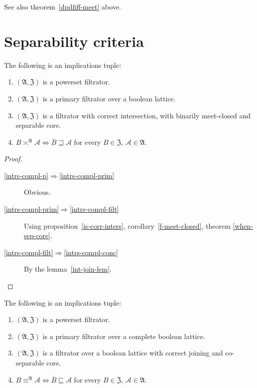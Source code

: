 See also theorem~\ref{dpdfiff-meet} above.

\section{Separability criteria}
\begin{thm}
\label{f-intrs-and-compl}The following is an implications tuple:
\begin{enumerate}
\item \label{intrs-compl-p}$(\mathfrak{A},\mathfrak{Z})$ is a powerset
filtrator.
\item \label{intrs-compl-prim}$(\mathfrak{A},\mathfrak{Z})$ is a primary
filtrator over a boolean lattice.
\item \label{intrs-compl-filt}$(\mathfrak{A},\mathfrak{Z})$ is a filtrator with correct intersection,
with binarily meet-closed and separable core.
\item \label{intrs-compl-conc}$B\asymp^{\mathfrak{A}}\mathcal{A}\Leftrightarrow\overline{B}\sqsupseteq\mathcal{A}$
for every $B\in\mathfrak{Z}$, $\mathcal{A}\in\mathfrak{A}$.
\end{enumerate}
\end{thm}
\begin{proof}
~
\begin{description}
\item [{\ref{intrs-compl-p}$\Rightarrow$\ref{intrs-compl-prim}}] Obvious.
\item [{\ref{intrs-compl-prim}$\Rightarrow$\ref{intrs-compl-filt}}] Using
proposition~\ref{is-corr-inters}, corollary~\ref{f-meet-closed}, theorem
\ref{when-sep-core}.
\item [{\ref{intrs-compl-filt}$\Rightarrow$\ref{intrs-compl-conc}}] By
the lemma~\ref{int-join-lem}.
\end{description}
\end{proof}
\begin{thm}
The following is an implications tuple:
\begin{enumerate}
\item \label{join-compl-p}$(\mathfrak{A},\mathfrak{Z})$ is a powerset
filtrator.
\item \label{join-compl-prim}$(\mathfrak{A},\mathfrak{Z})$ is a primary
filtrator over a complete boolean lattice.
\item \label{join-compl-filt}$(\mathfrak{A},\mathfrak{Z})$ is a filtrator over a boolean lattice
with correct joining and co-separable core.
\item \label{join-compl-conc}$B\equiv^{\mathfrak{A}}\mathcal{A}\Leftrightarrow\overline{B}\sqsubseteq\mathcal{A}$
for every $B\in\mathfrak{Z}$, $\mathcal{A}\in\mathfrak{A}$.
\end{enumerate}
\end{thm}
